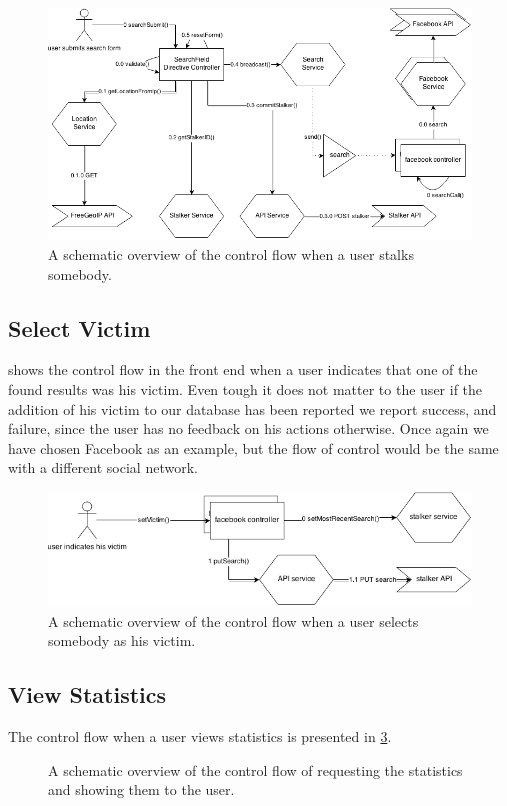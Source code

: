 		\begin{figure}
			\includegraphics[width=\textwidth]{./img/1_stalking_flow}
			\caption{A schematic overview of the control flow when a user stalks somebody.}
			\label{fig:1:controlflowStalk}
		\end{figure}	

\subsection{Select Victim}
	 shows the control flow in the front end when a user indicates that one of the found results was his victim. Even tough it does not matter to the user if the addition of his victim to our database has been reported we report success, and failure, since the user has no feedback on his actions otherwise. Once again we have chosen Facebook as an example, but the flow of control would be the same with a different social network. 

		\begin{figure}
			\includegraphics[width=\textwidth]{./img/1_add_victim_flow}
			\caption{A schematic overview of the control flow when a user selects somebody as his victim.}
			\label{fig:1:controlflowVictim}
		\end{figure}		

\subsection{View Statistics}
	The control flow when a user views statistics is presented in \cref{fig:1:controlflowStat}.


	\begin{figure}
		\caption{A schematic overview of the control flow of requesting the statistics and showing them to the user.}
		\label{fig:1:controlflowStat}
	\end{figure}